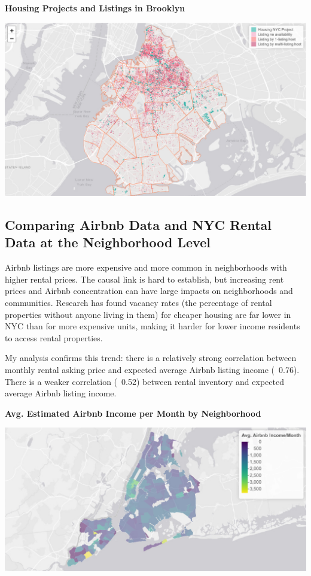 \documentclass[12pt]{article}
\begin{document}
\begin{center}
  \textbf{Housing Projects and Listings in Brooklyn}

  \includegraphics[width=6.5in]{./brooklyn.png}
\end{center}

\newpage

\subsection{Comparing Airbnb Data and NYC Rental Data at the Neighborhood Level}

Airbnb listings are more expensive and more common in neighborhoods with higher rental prices. The causal link is hard to establish, but increasing rent prices and Airbnb concentration can have large impacts on neighborhoods and communities. Research has found vacancy rates (the percentage of rental properties without anyone living in them) for cheaper housing are far lower in NYC than for more expensive units, making it harder for lower income residents to access rental properties.

My analysis confirms this trend: there is a relatively strong correlation between monthly rental asking price and expected average Airbnb listing income (~0.76). There is a weaker correlation (~0.52) between rental inventory and expected average Airbnb listing income.

\begin{center}
  \textbf{Avg. Estimated Airbnb Income per Month by Neighborhood}

  \includegraphics[width=6.5in]{./airbnb-income.png}
\end{center}
\end{document}
